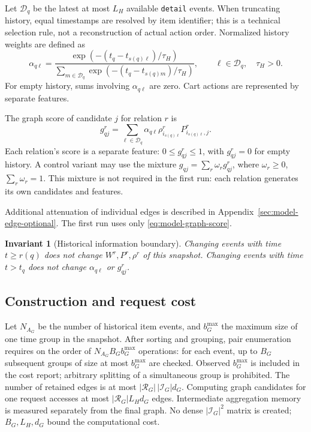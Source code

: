 \documentclass[12pt,a4paper]{article}
\newcommand{\code}[1]{{\ttfamily\small\nolinkurl{#1}}}
\theoremstyle{plainru}
\newtheorem{invariant}{Invariant}[section]
\begin{document}
Let $\mathcal D_q$ be the latest at most $L_H$ available
\code{detail} events. When truncating history, equal timestamps
are resolved by item identifier; this is a technical selection rule,
not a reconstruction of actual action order.
Normalized history weights are defined as
\begin{equation}\label{eq:model-history-weight}
\alpha_{q\ell}=
\frac{\exp(-(t_q-t_{s(q)\ell})/\tau_H)}
 {\sum_{m\in\mathcal D_q}\exp(-(t_q-t_{s(q)m})/\tau_H)},
\qquad \ell\in\mathcal D_q,\quad\tau_H>0.
\end{equation}
For empty history, sums involving $\alpha_{q\ell}$ are zero.
Cart actions are represented by separate features.

The graph score of candidate $j$ for relation $r$ is
\begin{equation}\label{eq:model-graph-score}
g^r_{qj}=\sum_{\ell\in\mathcal D_q}
\alpha_{q\ell}\rho^r_{i_{s(q)\ell}}
P^r_{i_{s(q)\ell},j}.
\end{equation}
Each relation's score is a separate feature:
$0\le g^r_{qj}\le1$, with $g^r_{qj}=0$ for empty history.
A control variant may use the mixture
$g_{qj}=\sum_r\omega_r g^r_{qj}$, where
$\omega_r\ge0$, $\sum_r\omega_r=1$.
This mixture is not required in the first run:
each relation generates its own candidates and features.

Additional attenuation of individual edges is described in Appendix~\ref{sec:model-edge-optional}.
The first run uses only \eqref{eq:model-graph-score}.

\begin{invariant}[Historical information boundary]
Changing events with time $t\ge r(q)$ does not change
$W^r,P^r,\rho^r$ of this snapshot. Changing events with time
$t>t_q$ does not change $\alpha_{q\ell}$ or $g^r_{qj}$.
\end{invariant}

\subsection{Construction and request cost}

Let $N_{A_G}$ be the number of historical item events,
and $b_G^{\max}$ the maximum size of one time group in the snapshot.
After sorting and grouping, pair enumeration requires on the order of
$N_{A_G}B_Gb_G^{\max}$ operations: for each event, up to $B_G$
subsequent groups of size at most $b_G^{\max}$ are checked.
Observed $b_G^{\max}$ is included in the cost report;
arbitrary splitting of a simultaneous group is prohibited.
The number of retained edges is at most
$|\mathcal R_G|\,|\mathcal I_G|d_G$.
Computing graph candidates for one request accesses
at most $|\mathcal R_G|L_Hd_G$ edges.
Intermediate aggregation memory is measured separately from the final graph.
No dense $|\mathcal I_G|^2$ matrix is created; $B_G,L_H,d_G$
bound the computational cost.
\end{document}
